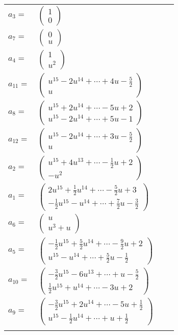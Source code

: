 \documentclass[1p]{elsarticle_modified}
\theoremstyle{definition}
\begin{document}
\begin{tabular}{m{7pt} m{180pt} m{7pt} m{180pt} }
\flushright $a_{3}=$&$\begin{pmatrix}1\\0\end{pmatrix}$ \\
\flushright $a_{7}=$&$\begin{pmatrix}0\\u\end{pmatrix}$ \\
\flushright $a_{4}=$&$\begin{pmatrix}1\\u^2\end{pmatrix}$ \\
\flushright $a_{11}=$&$\begin{pmatrix}u^{15}-2 u^{14}+\cdots+4 u-\frac{5}{2}\\u\end{pmatrix}$ \\
\flushright $a_{8}=$&$\begin{pmatrix}u^{15}+2 u^{14}+\cdots-5 u+2\\u^{15}-2 u^{14}+\cdots+5 u-1\end{pmatrix}$ \\
\flushright $a_{12}=$&$\begin{pmatrix}u^{15}-2 u^{14}+\cdots+3 u-\frac{5}{2}\\u\end{pmatrix}$ \\
\flushright $a_{2}=$&$\begin{pmatrix}u^{15}+4 u^{13}+\cdots-\frac{1}{2} u+2\\- u^2\end{pmatrix}$ \\
\flushright $a_{1}=$&$\begin{pmatrix}2 u^{15}+\frac{1}{2} u^{14}+\cdots-\frac{5}{2} u+3\\-\frac{1}{2} u^{15}- u^{14}+\cdots+\frac{7}{2} u-\frac{3}{2}\end{pmatrix}$ \\
\flushright $a_{6}=$&$\begin{pmatrix}u\\u^3+u\end{pmatrix}$ \\
\flushright $a_{5}=$&$\begin{pmatrix}-\frac{1}{2} u^{15}+\frac{5}{2} u^{14}+\cdots-\frac{9}{2} u+2\\u^{15}- u^{14}+\cdots+\frac{5}{2} u-\frac{1}{2}\end{pmatrix}$ \\
\flushright $a_{10}=$&$\begin{pmatrix}-\frac{3}{2} u^{15}-6 u^{13}+\cdots+u-\frac{5}{2}\\\frac{1}{2} u^{15}+u^{14}+\cdots-3 u+2\end{pmatrix}$ \\
\flushright $a_{9}=$&$\begin{pmatrix}-\frac{3}{2} u^{15}+2 u^{14}+\cdots-5 u+\frac{1}{2}\\u^{15}-\frac{1}{2} u^{14}+\cdots+u+\frac{1}{2}\end{pmatrix}$\\&\end{tabular}
\end{document}
